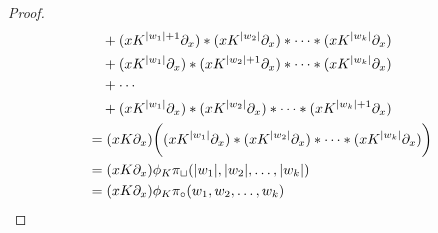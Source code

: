\begin{proof}
\begin{equation*}
\begin{split}
				&\quad + ({x}{K^{|w_1|+1}}\partial_{x})*({x}{K^{|w_2|}}\partial_{x})
					*\cdots*({x}{K^{|w_k|}}\partial_{x}) \\
				&\quad + ({x}{K^{|w_1|}}\partial_{x})*({x}{K^{|w_2|+1}}\partial_{x})
					*\cdots*({x}{K^{|w_k|}}\partial_{x}) \\
				&\quad + \cdots \\
				&\quad + ({x}{K^{|w_1|}}\partial_{x})*({x}{K^{|w_2|}}\partial_{x})
					*\cdots*({x}{K^{|w_k|+1}}\partial_{x}) \\
			&= ({x}{K}\partial_{x})\biggl(({x}{K^{|w_1|}}\partial_{x})*({x}{K^{|w_2|}}\partial_{x})
				*\cdots*({x}{K^{|w_k|}}\partial_{x})\biggr) \\
			&= ({x}{K}\partial_{x})\phi_K\pi_\sqcup(|w_1|,|w_2|,\dots,|w_k|) \\
			&= ({x}{K}\partial_{x})\phi_K\pi_\circ(w_1,w_2,\dots,w_k)
		\end{split}\end{equation*} %
	\end{proof} %


